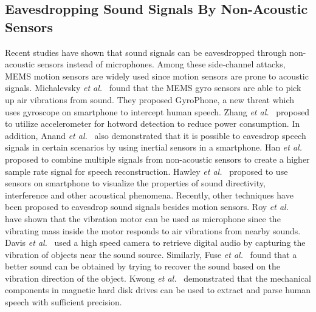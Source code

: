 \subsection{Eavesdropping Sound Signals By Non-Acoustic Sensors}
Recent studies have shown that sound signals can be eavesdropped through non-acoustic sensors instead of microphones.
%
Among these side-channel attacks, MEMS motion sensors are widely used since motion sensors are prone to acoustic signals.
%
Michalevsky \emph{et al.}~\cite{michalevsky2014gyrophone} found that the MEMS gyro sensors are able to pick up air vibrations from sound. 
%
They proposed GyroPhone, a new threat which uses  gyroscope on smartphone to intercept human speech.  
%
Zhang \emph{et al.}~\cite{zhang2015accelword} proposed to utilize accelerometer  for hotword detection to reduce power consumption.
%
In addition, Anand \emph{et al.}~\cite{anand2018speechless} also demonstrated that it is possible to eavesdrop speech signals in certain scenarios by using inertial sensors in a smartphone. 
%
Han \emph{et al.}~\cite{han2017pitchln} proposed to combine multiple signals from non-acoustic sensors to create a higher sample rate signal for speech reconstruction.
%
Hawley \emph{et al.}~\cite{hawley2018visualizing} proposed to use sensors on smartphone to visualize the properties of sound directivity, interference and other acoustical phenomena. 
%
Recently, other techniques have been proposed to eavesdrop sound signals besides motion sensors.
%
Roy \emph{et al.}~\cite{roy2016listening} have shown that the vibration motor  can be used as microphone since the vibrating mass inside the motor responds to air vibrations from nearby sounds.
%
Davis \emph{et al.}~\cite{davis2014visual} used a high speed camera to retrieve digital audio by capturing the vibration of objects near the sound source.
%
Similarly, Fuse \emph{et al.}~\cite{fuse2018sound} found that a better sound can be obtained by trying to recover the sound based on the vibration direction of the object.
%
Kwong \emph{et al.}~\cite{kwonghard} demonstrated that the mechanical components in magnetic hard disk drives can be used to extract and parse human speech with sufficient precision. 


